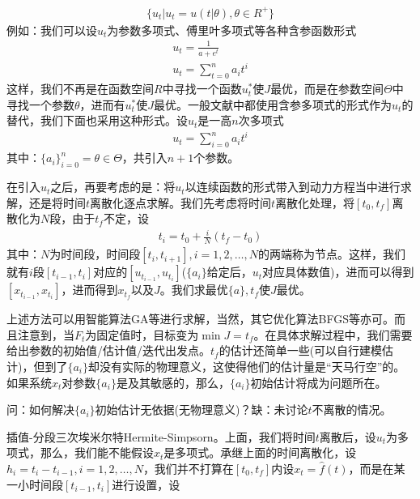             \begin{align*}
            \{u_t|u_t = u(t|\theta),\theta\in R^+\}
            \end{align*}
            例如：我们可以设$u_t$为参数多项式、傅里叶多项式等各种含参函数形式
            \begin{align*}
            u_t = \frac{1}{a+e^t}\\
            u_t = \sum_{t=0}^n a_i t^i
            \end{align*}
            这样，我们不再是在函数空间$R$中寻找一个函数$u_t^*$使$J$最优，而是在参数空间$\Theta$中寻找一个参数$\theta$，进而有$u_t^*$使$J$最优。一般文献中都使用含参多项式的形式作为$u_t$的替代，我们下面也采用这种形式。设$u_t$是一高$n$次多项式
            \begin{align*}
            u_t = \sum_{i=0}^na_it^i
            \end{align*}
            其中：$\{a_i\}_{i=0}^n = \theta\in \Theta$，共引入$n+1$个参数。
            \par
            在引入$u_t$之后，再要考虑的是：将$u_t$以连续函数的形式带入到动力方程当中进行求解，还是将时间$t$离散化逐点求解。我们先考虑将时间$t$离散化处理，将$[t_0,t_f]$离散化为$N$段，由于$t_f$不定，设
            \begin{align*}
            t_i = t_0 + \frac{i}{N}(t_f-t_0)
            \end{align*}
            其中：$N$为时间段，时间段$[t_i,t_{i+1}],i=1,2,\dots,N$的两端称为节点。这样，我们就有$i$段$[t_{i-1},t_i]$对应的$[u_{t_{i-1}},u_{t_i}]$($\{a_i\}$给定后，$u_t$对应具体数值)，进而可以得到$[x_{t_{i-1}},x_{t_i}]$，进而得到$x_{t_f}$以及$J$。我们求最优$\{a\},t_f$使$J$最优。
            \par
            上述方法可以用智能算法GA等进行求解，当然，其它优化算法BFGS等亦可。而且注意到，当$F_t$为固定值时，目标变为$\min J = t_f$。在具体求解过程中，我们需要给出参数的初始值/估计值/迭代出发点。$t_f$的估计还简单一些(可以自行建模估计)，但到了$\{a_i\}$却没有实际的物理意义，这使得他们的估计量是“天马行空”的。如果系统$x_t$对参数$\{a_i\}$是及其敏感的，那么，$\{a_i\}$初始估计将成为问题所在。
            \par
            问：如何解决$\{a_i\}$初始估计无依据(无物理意义)？缺：未讨论$t$不离散的情况。
            \par
            插值-分段三次埃米尔特Hermite-Simpsorn。上面，我们将时间$t$离散后，设$u_t$为多项式，那么，我们能不能假设$x_t$是多项式。承继上面的时间离散化，设$h_i=t_i-t_{i-1},i=1,2,\dots,N$，我们并不打算在$[t_0,t_f]$内设$x_t = \hat{f}(t)$，而是在某一小时间段$[t_{i-1},t_i]$进行设置，设
